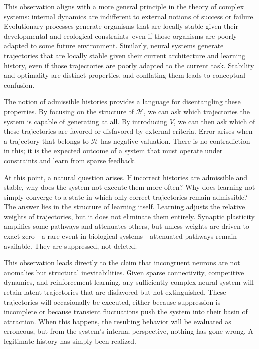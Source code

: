 \documentclass[11pt]{article}
\newcommand{\histories}{\mathcal{H}}
\newcommand{\valuation}{V}
\begin{document}
This observation aligns with a more general principle in the theory of complex systems: internal dynamics are indifferent to external notions of success or failure. Evolutionary processes generate organisms that are locally stable given their developmental and ecological constraints, even if those organisms are poorly adapted to some future environment. Similarly, neural systems generate trajectories that are locally stable given their current architecture and learning history, even if those trajectories are poorly adapted to the current task. Stability and optimality are distinct properties, and conflating them leads to conceptual confusion.

The notion of admissible histories provides a language for disentangling these properties. By focusing on the structure of $\histories$, we can ask which trajectories the system is capable of generating at all. By introducing $\valuation$, we can then ask which of these trajectories are favored or disfavored by external criteria. Error arises when a trajectory that belongs to $\histories$ has negative valuation. There is no contradiction in this; it is the expected outcome of a system that must operate under constraints and learn from sparse feedback.

At this point, a natural question arises. If incorrect histories are admissible and stable, why does the system not execute them more often? Why does learning not simply converge to a state in which only correct trajectories remain admissible? The answer lies in the structure of learning itself. Learning adjusts the relative weights of trajectories, but it does not eliminate them entirely. Synaptic plasticity amplifies some pathways and attenuates others, but unless weights are driven to exact zero—a rare event in biological systems—attenuated pathways remain available. They are suppressed, not deleted.

This observation leads directly to the claim that incongruent neurons are not anomalies but structural inevitabilities. Given sparse connectivity, competitive dynamics, and reinforcement learning, any sufficiently complex neural system will retain latent trajectories that are disfavored but not extinguished. These trajectories will occasionally be executed, either because suppression is incomplete or because transient fluctuations push the system into their basin of attraction. When this happens, the resulting behavior will be evaluated as erroneous, but from the system’s internal perspective, nothing has gone wrong. A legitimate history has simply been realized.
\end{document}
